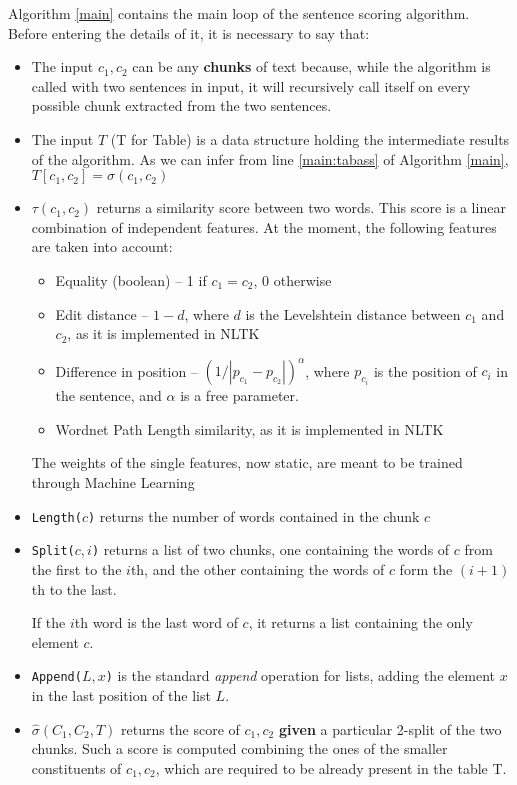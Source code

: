 Algorithm \ref{main} contains the main loop of the sentence scoring algorithm. Before entering the details of it, it is necessary to say that:
\begin{itemize}
\item The input $c_1,c_2$ can be any \textbf{chunks} of text because, while the algorithm is called with two sentences in input, it will recursively call itself on every possible chunk extracted from the two sentences.
\item The input $T$ (T for Table) is a data structure holding the intermediate results of the algorithm. As we can infer from line \ref{main:tabass} of Algorithm \ref{main}, $T[c_1,c_2]=\sigma(c_1,c_2)$
\item $\tau(c_1,c_2)$ returns a similarity score between two words. This score is a linear combination of independent features. At the moment, the following features are taken into account:
\begin{itemize}
\item Equality (boolean) -- 1 if $c_1=c_2$, 0 otherwise
\item Edit distance -- $1-d$, where $d$ is the Levelshtein distance \cite{levelshtein-66-binary} between $c_1$ and $c_2$, as it is implemented in NLTK \cite{Loper:2002:NNL:1118108.1118117}
\item Difference in position -- $(1/|p_{c_1}-p_{c_2}|)^\alpha$, where $p_{c_i}$ is the position of $c_i$ in the sentence, and $\alpha$ is a free parameter.
\item Wordnet \cite{Miller:1995:WLD:219717.219748} Path Length similarity, as it is implemented in NLTK
\end{itemize}
The weights of the single features, now static, are meant to be trained through Machine Learning
\item \texttt{Length($c$)} returns the number of words contained in the chunk $c$
\item \texttt{Split($c,i$)} returns a list of two chunks, one containing the words of $c$ from the first to the $i$th, and the other containing the words of $c$ form the $(i+1)$th to the last.

If the $i$th word is the last word of $c$, it returns a list containing the only element $c$.
\item \texttt{Append($L,x$)} is the standard \emph{append} operation for lists, adding the element $x$ in the last position of the list $L$.
\item $\hat{\sigma}(C_1,C_2,T)$ returns the score of $c_1,c_2$ \textbf{given} a particular 2-split of the two chunks. Such a score is computed combining the ones of the smaller constituents of $c_1,c_2$, which are required to be already present in the table T.


\end{itemize}
